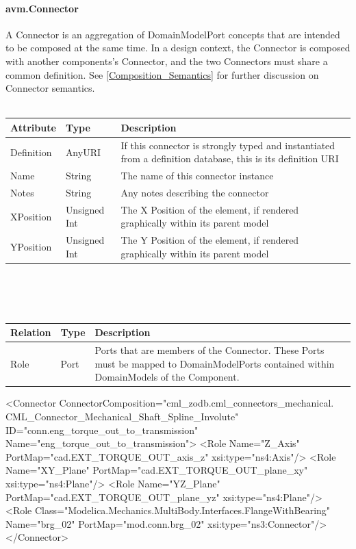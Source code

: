 \paragraph{avm.Connector}
A Connector is an aggregation of DomainModelPort concepts that are intended to be composed at the same time. In a design context, the Connector is composed with another components's Connector, and the two Connectors must share a common definition.
See \ref{Composition_Semantics} for further discussion on Connector semantics.
\\ \\
\begin{tabular}{ l l p{12cm} }
\textbf{Attribute} & \textbf{Type} & \textbf{Description} \\ \hline
Definition & AnyURI & If this connector is strongly typed and instantiated from a definition database, this is its definition URI\\ \hline
Name & String & The name of this connector instance \\ \hline
Notes & String & Any notes describing the connector \\ \hline
XPosition & Unsigned Int & The X Position of the element, if rendered graphically within its parent model \\ \hline
YPosition & Unsigned Int & The Y Position of the element, if rendered graphically within its parent model \\ \hline
\end{tabular}
\\ \\ \\
\begin{tabular}{ l l p{12cm} }
\textbf{Relation} & \textbf{Type} & \textbf{Description} \\ \hline
Role & Port & Ports that are members of the Connector. These Ports must be mapped to DomainModelPorts contained within DomainModels of the Component. \\ \hline
\end{tabular}

\begin{MyVerbatim}
  <Connector 
    ConnectorComposition="cml_zodb.cml_connectors_mechanical.
      CML_Connector_Mechanical_Shaft_Spline_Involute" 
    ID="conn.eng_torque_out_to_transmission" 
    Name="eng_torque_out_to_transmission">
    <Role Name="Z_Axis" PortMap="cad.EXT_TORQUE_OUT_axis_z"      
      xsi:type="ns4:Axis"/>
    <Role Name="XY_Plane" PortMap="cad.EXT_TORQUE_OUT_plane_xy" 
      xsi:type="ns4:Plane"/>
    <Role Name="YZ_Plane" PortMap="cad.EXT_TORQUE_OUT_plane_yz" 
      xsi:type="ns4:Plane"/>
    <Role Class="Modelica.Mechanics.MultiBody.Interfaces.FlangeWithBearing" 
      Name="brg_02" PortMap="mod.conn.brg_02" xsi:type="ns3:Connector"/>
  </Connector>
\end{MyVerbatim}

